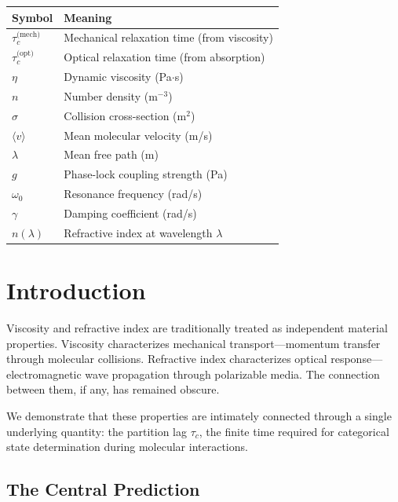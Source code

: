 \documentclass[twocolumn,10pt]{article}
\theoremstyle{definition}
\theoremstyle{remark}
\begin{document}
\begin{center}
\begin{tabular}{ll}
\toprule
\textbf{Symbol} & \textbf{Meaning} \\
\midrule
$\tau_c^{\text{(mech)}}$ & Mechanical relaxation time (from viscosity) \\
$\tau_c^{\text{(opt)}}$ & Optical relaxation time (from absorption) \\
$\eta$ & Dynamic viscosity (Pa$\cdot$s) \\
$n$ & Number density (m$^{-3}$) \\
$\sigma$ & Collision cross-section (m$^2$) \\
$\langle v \rangle$ & Mean molecular velocity (m/s) \\
$\lambda$ & Mean free path (m) \\
$g$ & Phase-lock coupling strength (Pa) \\
$\omega_0$ & Resonance frequency (rad/s) \\
$\gamma$ & Damping coefficient (rad/s) \\
$n(\lambda)$ & Refractive index at wavelength $\lambda$ \\
\bottomrule
\end{tabular}
\end{center}

\section{Introduction}
\label{sec:introduction}

Viscosity and refractive index are traditionally treated as independent material properties. Viscosity characterizes mechanical transport---momentum transfer through molecular collisions. Refractive index characterizes optical response---electromagnetic wave propagation through polarizable media. The connection between them, if any, has remained obscure.

We demonstrate that these properties are intimately connected through a single underlying quantity: the partition lag $\tau_c$, the finite time required for categorical state determination during molecular interactions.

\subsection{The Central Prediction}
\end{document}

